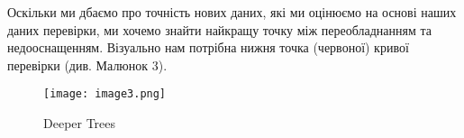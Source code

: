 Оскільки ми дбаємо про точність нових даних, які ми оцінюємо на основі наших даних перевірки, ми хочемо знайти найкращу точку між переобладнанням та недооснащенням.
Візуально нам потрібна нижня точка (червоної) кривої перевірки (див. Малюнок 3).

\begin{figure}
    \label{fig:image3}
    \centering
    \texttt{[image: image3.png]}

    Deeper Trees
\end{figure}
